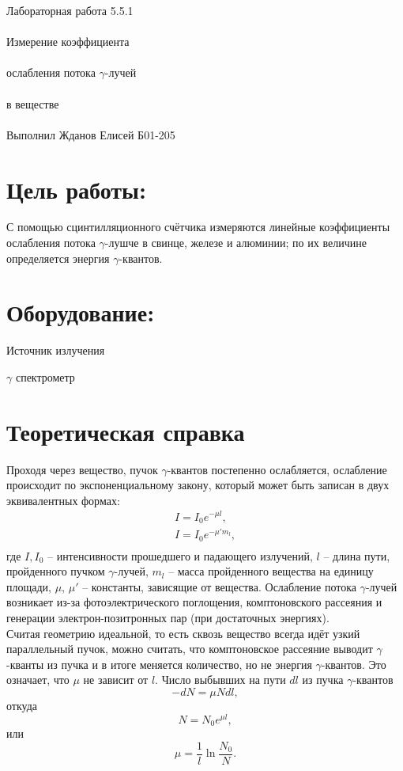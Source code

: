 \documentclass{astroedu-lab}
\begin{document}
\pagestyle{plain}

\begin{problem}{\huge Лабораторная работа 5.5.1\\\\Измерение коэффициента\\\\ослабления потока $\gamma$-лучей\\\\в веществе\\\\Выполнил Жданов Елисей Б01-205}

\section{Цель работы:}

С помощью сцинтилляционного счётчика измеряются линейные коэффициенты ослабления потока $\gamma$-лушче в свинце, железе и алюминии; по их величине определяется энергия $\gamma$-квантов.

\section{Оборудование:}

Источник излучения

$\gamma$ спектрометр

\section{Теоретическая справка}

Проходя через вещество, пучок $\gamma$-квантов постепенно ослабляется, ослабление происходит по экспоненциальному закону, который может быть записан в двух эквивалентных формах:
\[\begin{array}{l}
I = I_0 e^{-\mu l} ,\\
I = I_0 e^{-\mu' m_l},\\
\end{array}\]
где $I, I_0$ -- интенсивности прошедшего и падающего излучений, $l$ -- длина пути, пройденного пучком $\gamma$-лучей, $m_l$ -- масса пройденного вещества на единицу площади, $\mu$, $\mu'$ -- константы, зависящие от вещества. Ослабление потока $\gamma$-лучей возникает из-за фотоэлектрического поглощения, комптоновского рассеяния и генерации электрон-позитронных пар (при достаточных энергиях).\\
Считая геометрию идеальной, то есть сквозь вещество всегда идёт узкий параллельный пучок, можно считать, что комптоновское рассеяние выводит $\gamma$-кванты из пучка и в итоге меняется количество, но не энергия $\gamma$-квантов. Это означает, что $\mu$ не зависит от $l$. Число выбывших на пути $dl$ из пучка $\gamma$-квантов
\[-dN = \mu N dl,\]
откуда
\[N = N_0 e^{\mu l},\]
или
\begin{equation}
\mu = \dfrac{1}{l} \ln \dfrac{N_0}{N}.
\end{equation}


\end{problem}
\end{document}
